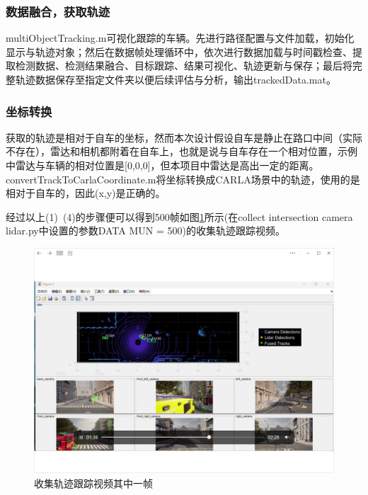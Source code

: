 \subsubsection{数据融合，获取轨迹}
multiObjectTracking.m可视化跟踪的车辆。先进行路径配置与文件加载，初始化显示与轨迹对象；然后在数据帧处理循环中，依次进行数据加载与时间戳检查、提取检测数据、检测结果融合、目标跟踪、结果可视化、轨迹更新与保存；最后将完整轨迹数据保存至指定文件夹以便后续评估与分析，输出trackedData.mat。
\subsubsection{坐标转换}
获取的轨迹是相对于自车的坐标，然而本次设计假设自车是静止在路口中间（实际不存在），雷达和相机都附着在自车上，也就是说与自车存在一个相对位置，示例中雷达与车辆的相对位置是[0,0,0]，但本项目中雷达是高出一定的距离。convertTrackToCarlaCoordinate.m将坐标转换成CARLA场景中的轨迹，使用的是相对于自车的，因此(x,y)是正确的。


经过以上(1)~(4)的步骤便可以得到500帧如图\ref{fig:p13}所示(在collect intersection camera lidar.py中设置的参数DATA MUN = 500)的收集轨迹跟踪视频。



\begin{figure}[htbp] %
	\centering
	\includegraphics[width=1\textwidth]{p13} %
	\caption{收集轨迹跟踪视频其中一帧} %
	\label{fig:p13} %
\end{figure}







